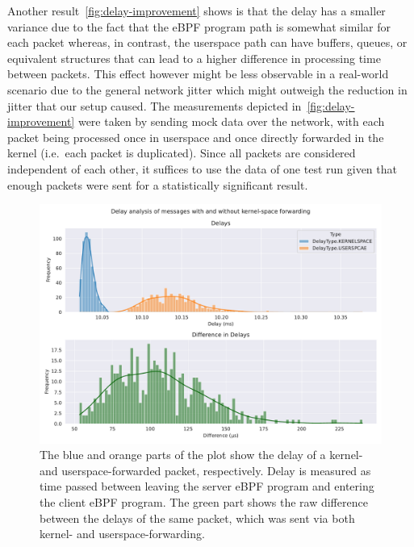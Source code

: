 Another result~\autoref{fig:delay-improvement} shows is that the delay has a smaller variance due to the fact 
that the eBPF program path is somewhat similar for each packet whereas, in contrast, the userspace path can have 
buffers, queues, or equivalent structures that can lead to a higher difference in processing time between packets. 
This effect however might be less observable in a real-world scenario due to the general network jitter which 
might outweigh the reduction in jitter that our setup caused.
The measurements depicted in~\autoref{fig:delay-improvement} were taken by sending mock data over 
the network, with each packet being processed once in userspace and once directly forwarded in the kernel
(i.e.~each packet is duplicated).
Since all packets are considered independent of each other, it suffices to use the data of one test run given 
that enough packets were sent for a statistically significant result.

\vspace{0.5cm}
\begin{figure}[H]
    \centering
    \includegraphics[width=\textwidth]{figures/04_testing_and_results/delays_small_packets_simple_userspace.pdf}
    \caption[Delay analysis of eBPF approach]{The blue and orange parts of the plot show the delay of a 
    kernel- and userspace-forwarded packet, respectively. Delay is measured as time passed between
    leaving the server eBPF program and entering the client eBPF program.
    The green part shows the raw difference between the delays of the same packet, which was sent via both 
    kernel- and userspace-forwarding.}\label{fig:delay-improvement}
\end{figure}
\vspace{0.5cm}

